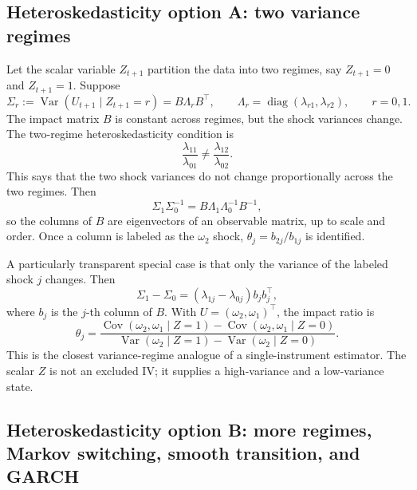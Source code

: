 \documentclass[11pt]{article}
\newcommand{\T}{\top}
\newcommand{\Cov}{\operatorname{Cov}}
\newcommand{\Var}{\operatorname{Var}}
\newcommand{\diag}{\operatorname{diag}}
\theoremstyle{plain}
\theoremstyle{definition}
\theoremstyle{remark}
\begin{document}
\subsection{Heteroskedasticity option A: two variance regimes}
\label{subsec:regimes}

Let the scalar variable $Z_{t+1}$ partition the data into two regimes, say
$Z_{t+1}=0$ and $Z_{t+1}=1$. Suppose
\begin{equation}
\Sigma_r:=\Var(U_{t+1}\mid Z_{t+1}=r)=B\Lambda_rB^\T,
\qquad
\Lambda_r=\diag(\lambda_{r1},\lambda_{r2}),
\qquad r=0,1.
\label{eq:regime-covs}
\end{equation}
The impact matrix $B$ is constant across regimes, but the shock variances change.
The two-regime heteroskedasticity condition is
\begin{equation}
\frac{\lambda_{11}}{\lambda_{01}}
\ne
\frac{\lambda_{12}}{\lambda_{02}}.
\label{eq:nonprop}
\end{equation}
This says that the two shock variances do not change proportionally across the
two regimes. Then
\begin{equation}
\Sigma_1\Sigma_0^{-1}=B\Lambda_1\Lambda_0^{-1}B^{-1},
\label{eq:eigen}
\end{equation}
so the columns of $B$ are eigenvectors of an observable matrix, up to scale and
order. Once a column is labeled as the $\omega_2$ shock, $\theta_j=b_{2j}/b_{1j}$ is
identified.

A particularly transparent special case is that only the variance of the labeled
shock $j$ changes. Then
\begin{equation}
\Sigma_1-\Sigma_0=(\lambda_{1j}-\lambda_{0j})b_jb_j^\T,
\label{eq:onediff}
\end{equation}
where $b_j$ is the $j$-th column of $B$. With
$U=(\omega_2,\omega_1)^\T$, the impact ratio is
\begin{equation}
\theta_j=
\frac{\Cov(\omega_2,\omega_1\mid Z=1)-\Cov(\omega_2,\omega_1\mid Z=0)}
     {\Var(\omega_2\mid Z=1)-\Var(\omega_2\mid Z=0)}.
\label{eq:rigobon-ratio}
\end{equation}
This is the closest variance-regime analogue of a single-instrument estimator.
The scalar $Z$ is not an excluded IV; it supplies a high-variance and a low-variance
state.

\subsection{Heteroskedasticity option B: more regimes, Markov switching, smooth transition, and GARCH}
\end{document}
